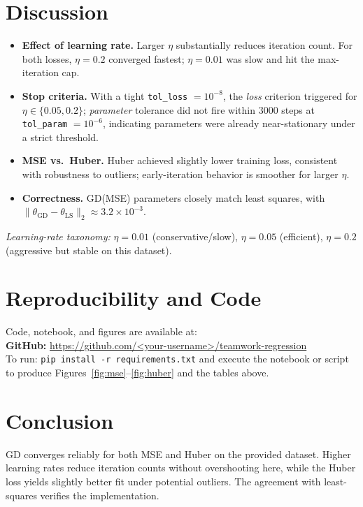 \documentclass[11pt]{article}
\begin{document}
\section{Discussion}
\begin{itemize}[leftmargin=1.5em]
\item \textbf{Effect of learning rate.} Larger $\eta$ substantially reduces iteration count. For both losses, $\eta=0.2$ converged fastest; $\eta=0.01$ was slow and hit the max-iteration cap.
\item \textbf{Stop criteria.} With a tight \texttt{tol\_loss} $=10^{-8}$, the \emph{loss} criterion triggered for $\eta\in\{0.05,0.2\}$; \emph{parameter} tolerance did not fire within $3000$ steps at \texttt{tol\_param} $=10^{-6}$, indicating parameters were already near-stationary under a strict threshold.
\item \textbf{MSE vs.\ Huber.} Huber achieved slightly lower training loss, consistent with robustness to outliers; early-iteration behavior is smoother for larger $\eta$.
\item \textbf{Correctness.} GD(MSE) parameters closely match least squares, with $\|\theta_{\mathrm{GD}}-\theta_{\mathrm{LS}}\|_2\approx 3.2\times10^{-3}$.
\end{itemize}
\noindent \textit{Learning-rate taxonomy:} $\eta{=}0.01$ (conservative/slow), $\eta{=}0.05$ (efficient), $\eta{=}0.2$ (aggressive but stable on this dataset).

\section{Reproducibility and Code}
Code, notebook, and figures are available at:\\[2pt]
\textbf{GitHub:} \href{https://github.com/<your-username>/teamwork-regression}{https://github.com/\textless your-username\textgreater/teamwork-regression}\\[3pt]
To run: \texttt{pip install -r requirements.txt} and execute the notebook or script to produce Figures~\ref{fig:mse}--\ref{fig:huber} and the tables above.

\section*{Conclusion}
GD converges reliably for both MSE and Huber on the provided dataset. Higher learning rates reduce iteration counts without overshooting here, while the Huber loss yields slightly better fit under potential outliers. The agreement with least-squares verifies the implementation.
\end{document}
